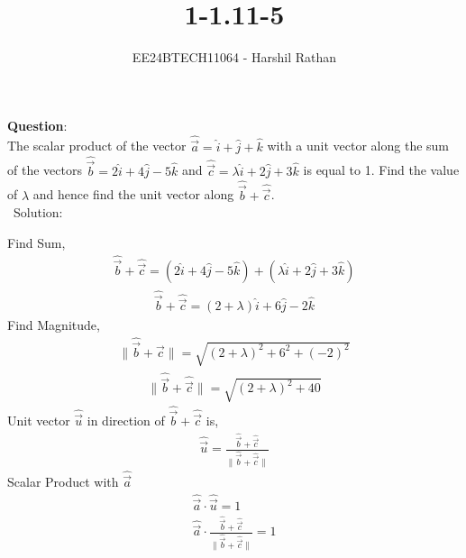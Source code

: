 \documentclass[journal]{IEEEtran}
\begin{document}

\vspace{3cm}

\title{1-1.11-5}
\author{EE24BTECH11064 - Harshil Rathan }
{\let\newpage\relax\maketitle}

\renewcommand{\thefigure}{\theenumi}
\renewcommand{\thetable}{\theenumi}
\setlength{\intextsep}{10pt} %


\renewcommand{\thetable}{\theenumi}
\textbf{Question}:\\
The scalar product of the vector $\hat{\vec{a}}=\hat{i}+\hat{j}+\hat{k}$ with a unit vector along the sum of the vectors $\hat{\vec{b}}=2\hat{i}+4\hat{j}-5\hat{k}$ and $\hat{\vec{c}}=\lambda\hat{i}+2\hat{j}+3\hat{k}$ is equal to 1. Find the value of $\lambda$ and hence find the unit vector along $\hat{\vec{b}}+\hat{\vec{c}}$.
\\
\ {Solution: }\\
\begin{table}[h!]
    \centering
    
\end{table}
Find Sum,
\begin{align}
     \hat{\vec{b}}+\hat{\vec{c}}= (2\hat{i}+4\hat{j}-5\hat{k})+(\lambda\hat{i}+2\hat{j}+3\hat{k})
\end{align}    
\begin{align}    
\hat{\vec{b}}+\hat{\vec{c}}=(2+\lambda)\hat{i}+6\hat{j}-2\hat{k}
\end{align}
Find Magnitude,
\begin{align}
\|\hat{\vec{b}}+\hat{\vec{c}}\|=\sqrt{(2+\lambda)^2+6^2+(-2)^2}
\end{align}
\begin{align}
\|\hat{\vec{b}}+\hat{\vec{c}}\|=\sqrt{(2+\lambda)^2+40}
\end{align}
Unit vector $\hat{\vec{u}}$ in direction of $\hat{\vec{b}}+\hat{\vec{c}}$ is,
\begin{align}
\hat{\vec{u}}=\frac{\hat{\vec{b}}+\hat{\vec{c}}}{\|\hat{\vec{b}}+\hat{\vec{c}}\|}
\end{align}
Scalar Product with $\hat{\vec{a}}$
\begin{align}
    \hat{\vec{a}} \cdot \hat{\vec{u}} =1\\
    \hat{\vec{a}} \cdot \frac{\hat{\vec{b}}+\hat{\vec{c}}}{\|\hat{\vec{b}}+\hat{\vec{c}}\|} =1
\end{align}
\end{document}
